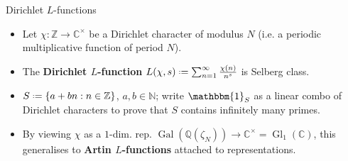 \documentclass[10pt]{beamer}
\newcommand{\N}{\mathbb{N}}
\newcommand{\Z}{\mathbb{Z}}
\newcommand{\Q}{\mathbb{Q}}
\newcommand{\C}{\mathbb{C}}
\newcommand*{\defeq}{\mathrel{\vcenter{\baselineskip0.5ex \lineskiplimit0pt
      \hbox{\scriptsize.}\hbox{\scriptsize.}}}%
  =}
\DeclareMathOperator{\Gl}{Gl}
\DeclareMathOperator{\Gal}{Gal}
\begin{document}
\begin{frame}{Dirichlet $L$-functions}
\begin{itemize}[leftmargin=2pt]
\item Let $\chi \colon \Z \to \C^{\times}$ be a Dirichlet character of modulus
  $N$ (i.e. a periodic multiplicative function of period $N$).\pause
\item The \textbf{Dirichlet $L$-function} $L(\chi,s)\defeq
  \sum_{n=1}^{\infty}\frac{\chi(n)}{n^{s}}$ is Selberg class. \pause
\item $S \defeq \{a + bn : n \in \Z\}$, $a,b \in \N$; write
  $\mathbbm{1}_{S}$ as a linear combo of Dirichlet characters to prove
  that $S$ contains infinitely many primes.\pause
\item By viewing $\chi$ as a $1$-dim. rep. $\Gal(\Q(\zeta_{N}))\to \C^{\times}= \Gl_{1}(\C)$, this
  generalises to \textbf{Artin $L$-functions} attached to representations.
\end{itemize}\vspace{-5pt}


\end{frame}
\end{document}
